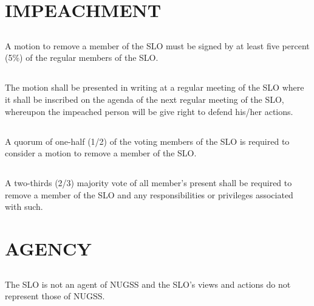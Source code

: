 \documentclass{article}
\begin{document}
\section{IMPEACHMENT}
\subsection{}
A motion to remove a member of the SLO must be signed by at least five percent (5\%) of the regular members of the SLO.
\subsection{}
The motion shall be presented in writing at a regular meeting of the SLO where it shall be inscribed on the agenda of the next regular meeting of the SLO, whereupon the impeached person will be give right to defend his/her actions.
\subsection{}
A quorum of one-half (1/2) of the voting members of the SLO is required to consider a motion to remove a member of the SLO.
\subsection{}
A two-thirds (2/3) majority vote of all member's present shall be required to remove a member of the SLO and any responsibilities or privileges associated with such.
\section{AGENCY}
\subsection{}
The SLO is not an agent of NUGSS and the SLO's views and actions do not represent those of NUGSS.
\end{document}
